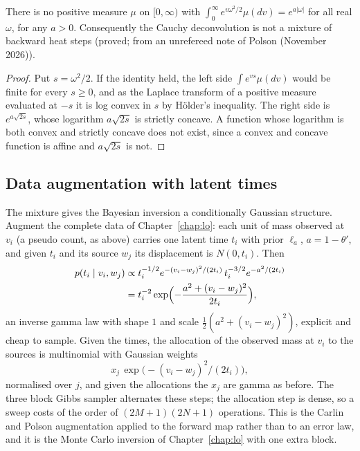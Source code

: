 \begin{proposition}\label{cx:prop:noinverse}
There is no positive measure $\mu$ on $[0,\infty)$ with $\int_0^\infty e^{v\omega^2/2}\mu(dv)=e^{a|\omega|}$ for all real $\omega$, for any $a>0$. Consequently the Cauchy deconvolution is not a mixture of backward heat steps (proved; from an unrefereed note of Polson (November 2026)).
\end{proposition}

\begin{proof}
Put $s=\omega^2/2$. If the identity held, the left side $\int e^{vs}\mu(dv)$ would be finite for every $s\ge0$, and as the Laplace transform of a positive measure evaluated at $-s$ it is log convex in $s$ by H\"older's inequality. The right side is $e^{a\sqrt{2s}}$, whose logarithm $a\sqrt{2s}$ is strictly concave. A function whose logarithm is both convex and strictly concave does not exist, since a convex and concave function is affine and $a\sqrt{2s}$ is not.
\end{proof}

\subsection{Data augmentation with latent times}

The mixture gives the Bayesian inversion a conditionally Gaussian structure. Augment the complete data of Chapter~\ref{chap:lo}: each unit of mass observed at $v_i$ (a pseudo count, as above) carries one latent time $t_i$ with prior $\ell_a$, $a=1-\theta'$, and given $t_i$ and its source $w_j$ its displacement is $N(0,t_i)$. Then
\begin{align*}
p(t_i\mid v_i,w_j)&\propto t_i^{-1/2}e^{-(v_i-w_j)^2/(2t_i)}\,t_i^{-3/2}e^{-a^2/(2t_i)}\\
&=t_i^{-2}\exp\Bigl(-\frac{a^2+(v_i-w_j)^2}{2t_i}\Bigr),
\end{align*}
an inverse gamma law with shape $1$ and scale $\tfrac12(a^2+(v_i-w_j)^2)$, explicit and cheap to sample. Given the times, the allocation of the observed mass at $v_i$ to the sources is multinomial with Gaussian weights
\[
x_j\,\exp\bigl(-(v_i-w_j)^2/(2t_i)\bigr),
\]
normalised over $j$, and given the allocations the $x_j$ are gamma as before. The three block Gibbs sampler alternates these steps; the allocation step is dense, so a sweep costs of the order of $(2M+1)(2N+1)$ operations. This is the Carlin and Polson augmentation \cite{CP91} applied to the forward map rather than to an error law, and it is the Monte Carlo inversion of Chapter~\ref{chap:lo} with one extra block.

